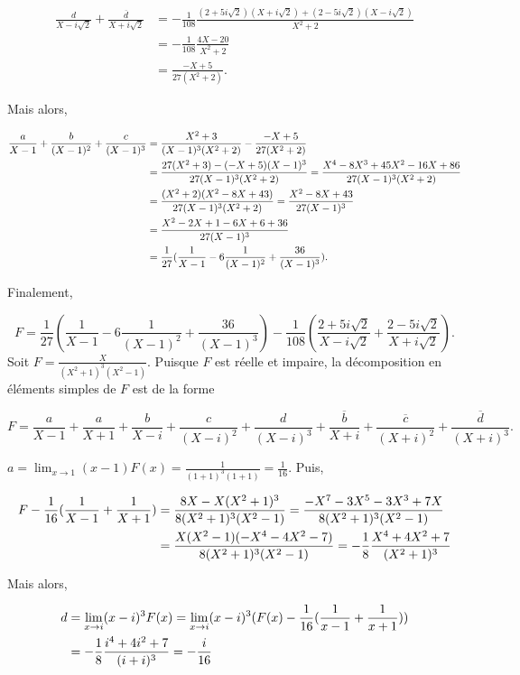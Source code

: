 {{\begin{align*}
\frac{d}{X-i\sqrt{2}}+\frac{\overline{d}}{X+i\sqrt{2}} &= -\frac{1}{108}\frac{(2+5i\sqrt{2})(X+i\sqrt{2})+ (2-5i\sqrt{2})(X-i\sqrt{2})}{X^2+2} \\
&= -\frac{1}{108}\frac{4X-20}{X^2+2} \\
&= \frac{-X+5}{27(X^2+2)}.
\end{align*}

Mais alors,

\begin{align*}\ensuremath
\frac{a}{X-1}+\frac{b}{(X-1)^2}+\frac{c}{(X-1)^3}&=\frac{X^2+3}{(X-1)^3(X^2+2)}-\frac{-X+5}{27(X^2+2)}\\
 &=\frac{27(X^2+3)-(-X+5)(X-1)^3}{27(X-1)^3(X^2+2)}=\frac{X^4-8X^3+45X^2-16X+86}{27(X-1)^3(X^2+2)}\\
 &=\frac{(X^2+2)(X^2-8X+43)}{27(X-1)^3(X^2+2)}=\frac{X^2-8X+43}{27(X-1)^3}\\
 &=\frac{X^2-2X+1-6X+6+36}{27(X-1)^3}\\
 &=\frac{1}{27}(\frac{1}{X-1}-6\frac{1}{(X-1)^2}+\frac{36}{(X-1)^3}).
\end{align*}

Finalement,

$$F=\frac{1}{27}(\frac{1}{X-1}-6\frac{1}{(X-1)^2}+\frac{36}{(X-1)^3})-\frac{1}{108}(\frac{2+5i\sqrt{2}}{X-i\sqrt{2}}+\frac{2-5i\sqrt{2}}{X+i\sqrt{2}}).$$
Soit $F=\frac{X}{(X^2+1)^3(X^2-1)}$. Puisque $F$ est réelle et impaire, la décomposition en éléments simples de $F$ est de la forme

$$F=\frac{a}{X-1}+\frac{a}{X+1}+\frac{b}{X-i}+\frac{c}{(X-i)^2}+\frac{d}{(X-i)^3}+\frac{\overline{b}}{X+i}+\frac{\overline{c}}{(X+i)^2}+\frac{\overline{d}}{(X+i)^3}.$$

$a=\lim_{x\rightarrow 1}(x-1)F(x)=\frac{1}{(1+1)^3(1+1)}=\frac{1}{16}$. Puis,

\begin{align*}\ensuremath
F-\frac{1}{16}(\frac{1}{X-1}+\frac{1}{X+1})&=\frac{8X-X(X^2+1)^3}{8(X^2+1)^3(X^2-1)}
=\frac{-X^7-3X^5-3X^3+7X}{8(X^2+1)^3(X^2-1)}\\
 &=\frac{X(X^2-1)(-X^4-4X^2-7)}{8(X^2+1)^3(X^2-1)}=-\frac{1}{8}\frac{X^4+4X^2+7}{(X^2+1)^3}
\end{align*}

Mais alors, 

\begin{align*}\ensuremath
d&=\lim_{x\rightarrow i}(x-i)^3F(x)=\lim_{x\rightarrow i}(x-i)^3(F(x)-\frac{1}{16}(\frac{1}{x-1}+\frac{1}{x+1}))\\
 &=-\frac{1}{8}\frac{i^4+4i^2+7}{(i+i)^3}=-\frac{i}{16}
\end{align*}

}}
